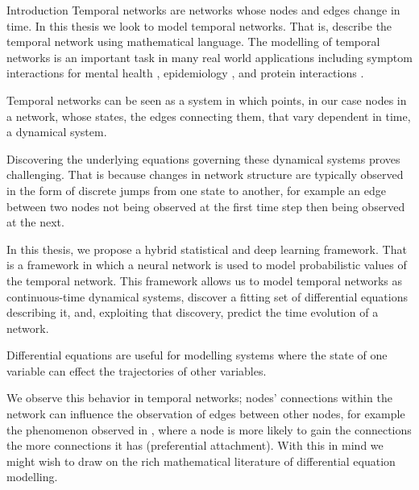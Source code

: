 \documentclass[12pt]{amsart}
\begin{document}
\begin{section}{Introduction}
    Temporal networks are networks whose nodes and edges change in time. In this thesis we look to model temporal networks. That is, describe the temporal network using mathematical language. 
    The modelling of temporal networks is an important task in many real world applications including symptom interactions for mental health \cite{jordan2020current,contreras2020temporal}, epidemiology \cite{masuda2013predicting}, and protein interactions \cite{lucas2021inferring,jin2009identifying}.

    Temporal networks can be seen as a system in which points, in our case nodes in a network, whose states, the edges connecting them, that vary dependent in time, a dynamical system. 

    Discovering the underlying equations governing these dynamical systems proves challenging. That is because changes in network structure are typically observed in the form of discrete jumps from one state to another, for example an edge between two nodes not being observed at the first time step then being observed at the next.

    In this thesis, we propose a hybrid statistical and deep learning framework. That is a framework in which a neural network is used to model probabilistic values of the temporal network. This framework allows us to model temporal networks as continuous-time dynamical systems, discover a fitting set of differential equations describing it, and, exploiting that discovery, predict the time evolution of a network.

    Differential equations are useful for modelling systems where the state of one variable can effect the trajectories of other variables. 

    We observe this behavior in temporal networks; nodes' connections within the network can influence the observation of edges between other nodes, for example the phenomenon observed in \cite{newman2001clustering,capocci2006preferential}, where a node is more likely to gain the connections the more connections it has (preferential attachment). With this in mind we might wish to draw on the rich mathematical literature of differential equation modelling.


\end{section}
\end{document}
